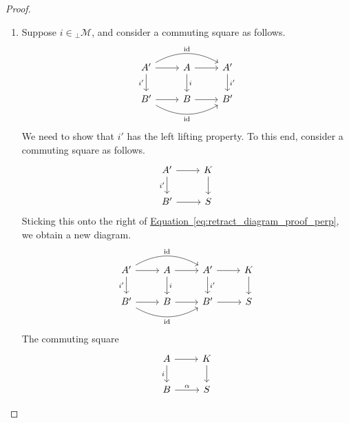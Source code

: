 \documentclass[main.tex]{subfiles}
\begin{document}
\begin{proof}
\begin{enumerate}
    \item Suppose $i \in {}_{\perp}\mathcal{M}$, and consider a commuting square as follows.
      \begin{equation}
        \label{eq:retract_diagram_proof_perp}
        \begin{tikzcd}
          A'
          \arrow[rr, bend left, "\id"]
          \arrow[r]
          \arrow[d, swap, "i'"]
          & A
          \arrow[r]
          \arrow[d, "i"]
          & A'
          \arrow[d, "i'"]
          \\
          B'
          \arrow[rr, bend right, swap, "\id"]
          \arrow[r]
          & B
          \arrow[r]
          & B'
        \end{tikzcd}
      \end{equation}
      We need to show that $i'$ has the left lifting property. To this end, consider a commuting square as follows.
      \begin{equation*}
        \begin{tikzcd}
          A'
          \arrow[r]
          \arrow[d, swap, "i'"]
          & K
          \arrow[d]
          \\
          B'
          \arrow[r]
          & S
        \end{tikzcd}
      \end{equation*}
      Sticking this onto the right of \hyperref[eq:retract_diagram_proof_perp]{Equation~\ref*{eq:retract_diagram_proof_perp}}, we obtain a new diagram.
      \begin{equation}
        \begin{tikzcd}
          A'
          \arrow[rr, bend left, "\id"]
          \arrow[r]
          \arrow[d, swap, "i'"]
          & A
          \arrow[r]
          \arrow[d, "i"]
          & A'
          \arrow[d, "i'"]
          \arrow[r]
          & K
          \arrow[d]
          \\
          B'
          \arrow[rr, bend right, swap, "\id"]
          \arrow[r]
          & B
          \arrow[r]
          & B'
          \arrow[r]
          & S
        \end{tikzcd}
      \end{equation}
      The commuting square
      \begin{equation*}
        \begin{tikzcd}
          A
          \arrow[r]
          \arrow[d, swap, "i"]
          & K
          \arrow[d]
          \\
          B
          \arrow[r, "\alpha"]
          & S

\end{tikzcd}
\end{equation*}
\end{enumerate}
\end{proof}
\end{document}
